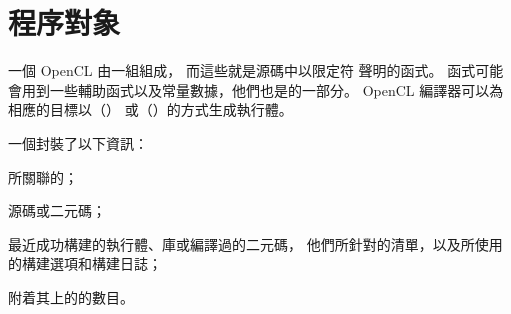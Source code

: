 \section{程序對象}

一個 OpenCL 由一組組成，
而這些就是源碼中以限定符  聲明的函式。
 函式可能會用到一些輔助函式以及常量數據，他們也是的一部分。
OpenCL 編譯器可以為相應的目標以{}（{}）
或{}（{}）的方式生成執行體。

一個封裝了以下資訊：
\startigBase
\item 所關聯的；
\item {}源碼或二元碼；
\item 最近成功構建的執行體、庫或編譯過的二元碼，
他們所針對的清單，以及所使用的構建選項和構建日誌；
\item 附着其上的的數目。
\stopigBase








